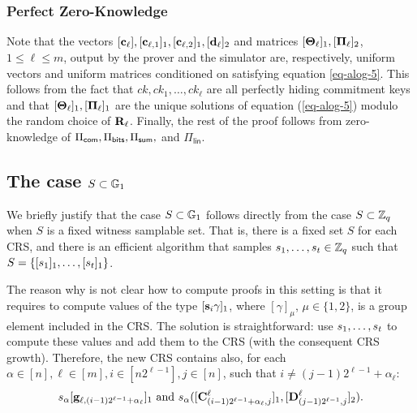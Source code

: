 \subsubsection{Perfect Zero-Knowledge}
Note that the vectors \([\mathbf{c}_\ell],[\mathbf{c}_{\ell,1}]_1,[\mathbf{c}_{\ell,2}]_1,[\mathbf{d}_\ell]_2\) and matrices \([\mathbf{{\Theta}}_\ell]_1,[\mathbf{{\Pi}}_\ell]_2\), \(1\leq\ell\leq m\), output by the prover and the simulator are, respectively, uniform vectors and uniform matrices conditioned on satisfying equation \ref{eq-alog-5}. This follows from the fact that \(ck,ck_1,\ldots,ck_\ell\) are all perfectly hiding commitment keys and that \([\mathbf{{\Theta}}_\ell]_1,[\mathbf{{\Pi}}_\ell]_1\) are the unique solutions of equation (\ref{eq-alog-5}) modulo the random choice of \(\mathbf{{R}}_\ell\). Finally, the rest of the proof follows from zero-knowledge of \(\Pi_{\mathsf{com}},\Pi_{\mathsf{bits}},\Pi_{\mathsf{sum}},\) and \(\Pi_\mathsf{lin}\).

\subsection{The case \(S\subset\mathbb{G}_1\)} \label{sec:improved-aZKSMP-group-case}
We briefly justify that the case \(S\subset\mathbb{G}_1\) follows directly from the case \(S\subset\mathbb{Z}_q\) when \(S\) is a fixed witness samplable set. That is, there is a fixed set $S$ for each CRS, and there is an efficient algorithm that samples \(s_1,\ldots,s_{t }\in\mathbb{Z}_q\) such that \(S=\{[s_1]_1,\ldots,[s_{t }]_1\}\). %

The reason why is not clear how to compute proofs in this setting is that it requires to compute values of the type \([\mathbf{s}_i \gamma]_1\), where \([\gamma]_\mu\), \(\mu\in\{1,2\}\), is a group element included in the CRS. The solution is straightforward: use \(s_1,\ldots,s_{t }\) to compute these values and add them to the CRS (with the consequent CRS growth). Therefore, the new CRS contains also, for each $\alpha\in[n],\ell\in[m],i\in[n2^{\ell-1}],j\in[n]$, such that $i\neq(j-1)2^{\ell-1}+\alpha_\ell$:
\begin{align*}
s_\alpha[\mathbf{g}_{\ell,(i-1)2^{\ell-1}+\alpha_\ell}]_1 \text{ and }
 s_\alpha([\mathbf{{C}}^\ell_{(i-1)2^{\ell-1}+\alpha_\ell,j}]_1,[\mathbf{{D}}_{(j-1)2^{\ell-1},j}^\ell]_2).
\end{align*}


